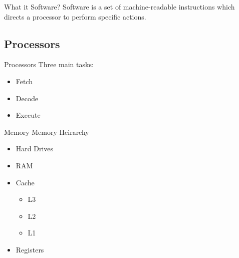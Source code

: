 \documentclass[serif,mathserif]{beamer}
\begin{document}
\begin{frame}{What it Software?}
  Software is a set of machine-readable instructions which directs a processor to perform specific actions.
\end{frame}

\subsection{Processors}

\begin{frame}{Processors}
  Three main tasks:
  \begin{itemize}
  \item<1-> Fetch 
  \item<1-> Decode 
  \item<1-> Execute 
  \end{itemize}
\end{frame}

\begin{frame}{Memory}
  Memory Heirarchy
  \begin{itemize}
  \item<1-> Hard Drives 
  \item<3-> RAM 
  \item<5-> Cache 
    \begin{itemize}
    \item<7-> L3 
    \item<7-> L2 
    \item<7-> L1 
    \end{itemize}
  \item<9-> Registers
  \end{itemize}
\end{frame}
\end{document}
